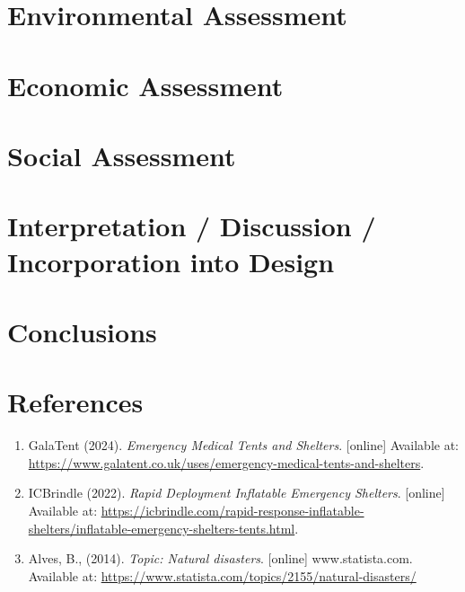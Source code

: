 \documentclass{article}
\begin{document}
\newpage

\section{Environmental Assessment}

\newpage

\section{Economic Assessment}

\newpage

\section{Social Assessment}

\newpage

\section{Interpretation / Discussion / Incorporation into Design}

\newpage

\section{Conclusions}

\newpage


\section{References}
\normalsize
\begin{enumerate}
\item GalaTent (2024). \textit{Emergency Medical Tents and Shelters}. [online] Available at: \url{https://www.galatent.co.uk/uses/emergency-medical-tents-and-shelters}.
\item ICBrindle (2022). \textit{Rapid Deployment Inflatable Emergency Shelters}. [online] Available at: \url{https://icbrindle.com/rapid-response-inflatable-shelters/inflatable-emergency-shelters-tents.html}.
\item Alves, B., (2014). \textit{Topic: Natural disasters}. [online] www.statista.com. Available at: \url{https://www.statista.com/topics/2155/natural-disasters/}
\end{enumerate}
	
\end{document}

